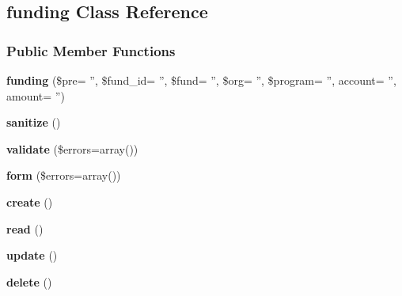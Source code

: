 \hypertarget{classfunding}{\subsection{funding Class Reference}
\label{classfunding}
}
\subsubsection*{Public Member Functions}
\begin{DoxyCompactItemize}
\item 
\hypertarget{classfunding_a14ea2650bff671baf21ae1b11f0ec468}{{\bfseries funding} (\$pre= '', \$fund\-\_\-id= '', \$fund= '', \$org= '', \$program= '', account= '', amount= '')}\label{classfunding_a14ea2650bff671baf21ae1b11f0ec468}

\item 
\hypertarget{classfunding_a75ec9e0289af4245f07fcfaac057c32c}{{\bfseries sanitize} ()}\label{classfunding_a75ec9e0289af4245f07fcfaac057c32c}

\item 
\hypertarget{classfunding_aa8cafb705f2d48254a99f1689edccd90}{{\bfseries validate} (\$errors=array())}\label{classfunding_aa8cafb705f2d48254a99f1689edccd90}

\item 
\hypertarget{classfunding_a1687ae9406c7a5749b5fddd6e7c75b12}{{\bfseries form} (\$errors=array())}\label{classfunding_a1687ae9406c7a5749b5fddd6e7c75b12}

\item 
\hypertarget{classfunding_a389dbb80bf1f79480baf806e87a97e26}{{\bfseries create} ()}\label{classfunding_a389dbb80bf1f79480baf806e87a97e26}

\item 
\hypertarget{classfunding_ac4cc66b323f4dbacaeee42610ef27a01}{{\bfseries read} ()}\label{classfunding_ac4cc66b323f4dbacaeee42610ef27a01}

\item 
\hypertarget{classfunding_a53b8e2eb37bebccbb88e8225a913215f}{{\bfseries update} ()}\label{classfunding_a53b8e2eb37bebccbb88e8225a913215f}

\item 
\hypertarget{classfunding_aa38f3aa17354941e7316962d712ae9ba}{{\bfseries delete} ()}\label{classfunding_aa38f3aa17354941e7316962d712ae9ba}

\end{DoxyCompactItemize}
